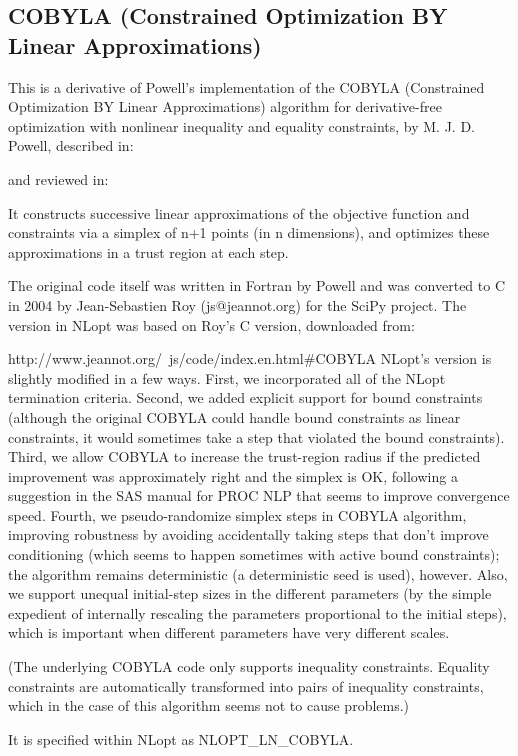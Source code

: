 \subsection{COBYLA (Constrained Optimization BY Linear Approximations)}
This is a derivative of Powell's implementation of the COBYLA (Constrained Optimization BY Linear Approximations) algorithm for derivative-free optimization with nonlinear inequality and equality constraints, by M. J. D. Powell, described in: \cite{Powell_1994}


and reviewed in: \cite{Powell_1998}


It constructs successive linear approximations of the objective function and constraints via a simplex of n+1 points (in n dimensions), and optimizes these approximations in a trust region at each step. 

The original code itself was written in Fortran by Powell and was converted to C in 2004 by Jean-Sebastien Roy (js@jeannot.org) for the SciPy project. The version in NLopt was based on Roy's C version, downloaded from: 

http://www.jeannot.org/~js/code/index.en.html\#COBYLA 
NLopt's version is slightly modified in a few ways. First, we incorporated all of the NLopt termination criteria. Second, we added explicit support for bound constraints (although the original COBYLA could handle bound constraints as linear constraints, it would sometimes take a step that violated the bound constraints). Third, we allow COBYLA to increase the trust-region radius if the predicted improvement was approximately right and the simplex is OK, following a suggestion in the SAS manual for PROC NLP that seems to improve convergence speed. Fourth, we pseudo-randomize simplex steps in COBYLA algorithm, improving robustness by avoiding accidentally taking steps that don't improve conditioning (which seems to happen sometimes with active bound constraints); the algorithm remains deterministic (a deterministic seed is used), however. Also, we support unequal initial-step sizes in the different parameters (by the simple expedient of internally rescaling the parameters proportional to the initial steps), which is important when different parameters have very different scales. 

(The underlying COBYLA code only supports inequality constraints. Equality constraints are automatically transformed into pairs of inequality constraints, which in the case of this algorithm seems not to cause problems.) 

It is specified within NLopt as NLOPT\_LN\_COBYLA. 






